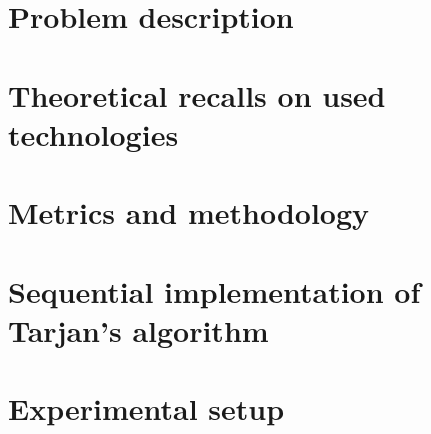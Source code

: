 \label{ch:1}


\section{Problem description}


\section{Theoretical recalls on used technologies}


\section{Metrics and methodology}


\section{Sequential implementation of Tarjan's algorithm}


\section{Experimental setup}

